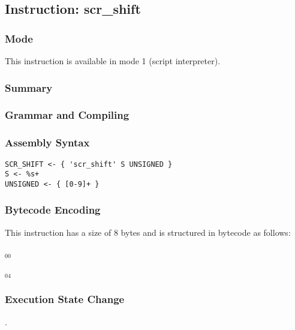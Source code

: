 \subsection{Instruction: scr\_shift}

\subsubsection{Mode}
This instruction is available in mode 1 (script interpreter).
\subsubsection{Summary}


\subsubsection{Grammar and Compiling}


\subsubsection{Assembly Syntax}

\begin{myquote}
\begin{verbatim}
SCR_SHIFT <- { 'scr_shift' S UNSIGNED }
S <- %s+
UNSIGNED <- { [0-9]+ }
\end{verbatim}
\end{myquote}

\subsubsection{Bytecode Encoding}

This instruction has a size of 8 bytes and is structured in bytecode as follows:

$_{00}$\ 



$_{04}$\ 

\subsubsection{Execution State Change}

.


